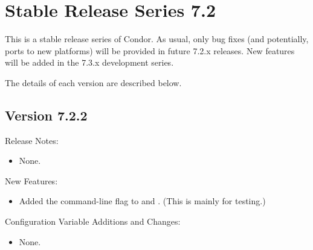 
\section{\label{sec:History-7-2}Stable Release Series 7.2}

This is a stable release series of Condor.
As usual, only bug fixes (and potentially, ports to new platforms)
will be provided in future 7.2.x releases.
New features will be added in the 7.3.x development series.

The details of each version are described below.


\subsection*{\label{sec:New-7-2-2}Version 7.2.2}

\noindent Release Notes:

\begin{itemize}

\item None.

\end{itemize}


\noindent New Features:

\begin{itemize}

\item Added the  command-line flag to 
and .  (This is mainly for testing.)

\end{itemize}

\noindent Configuration Variable Additions and Changes:

\begin{itemize}

\item None.

\end{itemize}

